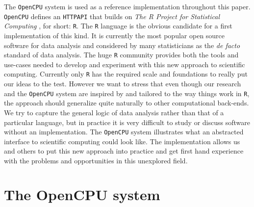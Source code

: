 \documentclass{article}
\newcommand{\R}{\texttt{R}\xspace}
\newcommand{\HTTP}{\texttt{HTTP}\xspace}
\newcommand{\API}{\texttt{API}\xspace}
\newcommand{\OpenCPU}{\texttt{OpenCPU}\xspace}
\begin{document}
The \OpenCPU system is used as a reference implementation throughout this paper. \OpenCPU defines an \HTTP \API that builds on \emph{The R Project for Statistical Computing} \citep{R}, for short: \R. The \R language is the obvious candidate for a first implementation of this kind. It is currently the most popular open source software for data analysis and considered by many statisticians as the \emph{de facto} standard of data analysis. The huge \R community provides both the tools and use-cases needed to develop and experiment with this new approach to scientific computing. Currently only \R has the required scale and foundations to really put our ideas to the test. However we want to stress that even though our research and the \OpenCPU system are inspired by and tailored to the way things work in \R, the approach should generalize quite naturally to other computational back-ends. We try to capture the general logic of data analysis rather than that of a particular language, but in practice it is very difficult to study or discuss software without an implementation. The \OpenCPU system illustrates what an abstracted interface to scientific computing could look like. The implementation allows us and others to put this new approach into practice and get first hand experience with the problems and opportunities in this unexplored field. 







 



\section{The OpenCPU system}
\end{document}

